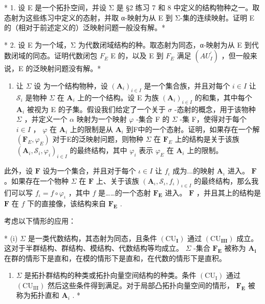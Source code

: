 \exercisegroup

* 1. 设 E 是一个拓扑空间，并设 Σ 是 §2 练习 7 和 8 中定义的结构物种之一。取态射为这些练习中定义的态射，并取 α-映射为从 E 到 Σ-集的连续映射。证明 E 的（相对于前述定义的）泛映射问题一般没有解。*

* 2. 设 E 为一个域，Σ 为代数闭域结构的种。取态射为同态，α-映射为从 E 到代数闭域的同态。证明代数闭包 \(F_{E}\) E 的，以及 E 到 \(F_{E}\) 满足 \((AU_{I}^{\prime})\) ，但一般来说，E 的泛映射问题没有解。*

\begin{enumerate}
\def\labelenumi{\arabic{enumi}.}
\setcounter{enumi}{2}
\tightlist
\item
  让 \(\Sigma\) 设 为一个结构物种，设 \((\mathbf{A}_i)_{i \in I}\) 是一个集合族，并且对每个 \(i \in I\) 让 \(\mathcal{S}_i\) 是物种 \(\Sigma\) 在 \(\mathbf{A}_i\) 上的一个结构。设 E 为族 \((\mathbf{A}_i)_{i \in I}\) 的和集，其中每个 \(\mathbf{A}_i\) 被视为 E 的子集。假设我们给定了一个关于 \(\sigma\) -态射的概念，用于该物种 \(\Sigma\) ，并定义一个 \(\alpha\) 映射为一个映射 \(\varphi\) -集合 F 的 \(\Sigma\) -集 F，使得对于每个 \(i \in I\) ， \(\varphi\) 在 \(\mathbf{A}_i\) 上的限制是从 \(\mathbf{A}_i\) 到F中的一个态射。证明，如果存在一个解 \((\mathbf{F}_E, \varphi_E)\) 对于E的泛映射问题，则物种 \(\Sigma\) 在 \(\mathbf{F}_E\) 上的结构是关于该族 \((\mathbf{A}_i, \mathcal{S}_i, \varphi_i)_{i \in I}\) 的最终结构，其中 \(\varphi_i\) 表示 \(\varphi_E\) 在 \(\mathbf{A}_i\) 上的限制。
\end{enumerate}

此外，设 \(\mathbf{F}\) 设为一个集合，并且对于每个 \(\iota \in I\) 让 \(f_{\iota}\) 成为...的映射 \(\mathbf{A}_{\iota}\) 进入。 \(\mathbf{F}\) 。如果存在一个物种 \(\Sigma\) 在 \(\mathbf{F}\) 上、关于该族 \((\mathbf{A}_{\iota}, \mathcal{S}_{\iota}, f_{\iota})_{\iota \in I}\) 的最终结构，那么我们可以写 \(f_{\iota} = f \circ \varphi_{\iota}\) ，其中 \(f\) 是……的一个态射 \(\mathbf{F}_{\mathbf{E}}\) 进入。 \(\mathbf{F}\) ，并且其上的结构是 \(\mathbf{F}\) 在 \(f\) 下的直接像，该结构来自 \(\mathbf{F}_{\mathbf{E}}\) .

考虑以下情形的应用：

* (i) \(\Sigma\) 是一类代数结构，其态射为同态，且条件 \((\mathrm{CU}_{\mathbf{I}})\) 通过 \((\mathrm{CU}_{\mathbf{III}})\) 成立。这对于半群结构、群结构、模结构、代数结构等均成立。 \(\Sigma\) -集合 \(\mathbf{F}_{\mathbf{E}}\) 被称为 \(\mathbf{A}_{\mathbf{i}}\) 在群的情形下是直和，在模的情形下是直和，在代数的情形下是直积。

\begin{enumerate}
\def\labelenumi{(\roman{enumi})}
\setcounter{enumi}{1}
\tightlist
\item
  \(\Sigma\) 是拓扑群结构的种类或拓扑向量空间结构的种类。条件 \((\mathrm{CU}_{\mathrm{I}})\) 通过 \((\mathrm{CU}_{\mathrm{III}})\) 然后这些条件得到满足。对于局部凸拓扑向量空间的情形， \(\mathbf{F}_{\mathbf{E}}\) 被称为拓扑直和 \(\mathbf{A}_{i}\) . *
\end{enumerate}

